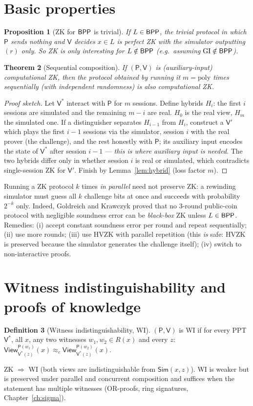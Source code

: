 \documentclass[11pt,a4paper]{report}
\theoremstyle{plain}
\newtheorem{theorem}{Theorem}[chapter]
\newtheorem{proposition}[theorem]{Proposition}
\theoremstyle{definition}
\newtheorem{definition}[theorem]{Definition}
\theoremstyle{remark}
\newcommand{\poly}{\mathrm{poly}}
\newcommand{\Prv}{\mathsf{P}}\newcommand{\Ver}{\mathsf{V}}
\newcommand{\Sim}{\mathsf{Sim}}\newcommand{\Ext}{\mathsf{Ext}}
\newcommand{\view}{\mathsf{View}}
\DeclareMathOperator{\GI}{GI}\DeclareMathOperator{\GNI}{GNI}
\begin{document}
\section{Basic properties}
\begin{proposition}[ZK for $\mathsf{BPP}$ is trivial]
If $L\in\mathsf{BPP}$, the trivial protocol in which $\Prv$ sends nothing and $\Ver$ decides $x\in L$ is perfect ZK with the simulator outputting $(r)$ only. So ZK is only interesting for $L\notin\mathsf{BPP}$ (e.g.\ assuming $\GI\notin\BPP$).
\end{proposition}
\begin{theorem}[Sequential composition]\label{thm:seqcomp}
If $(\Prv,\Ver)$ is (auxiliary-input) computational ZK, then the protocol obtained by running it $m=\poly$ times sequentially (with independent randomness) is also computational ZK.
\end{theorem}
\begin{proof}[Proof sketch]
Let $\Ver^*$ interact with $\Prv$ for $m$ sessions. Define hybrids $H_i$: the first $i$ sessions are simulated and the remaining $m-i$ are real. $H_0$ is the real view, $H_m$ the simulated one. If a distinguisher separates $H_{i-1}$ from $H_i$, construct a $\Ver'$ which plays the first $i-1$ sessions via the simulator, session $i$ with the real prover (the challenge), and the rest honestly with $\Prv$; its auxiliary input encodes the state of $\Ver^*$ after session $i-1$ --- \emph{this is where auxiliary input is needed}. The two hybrids differ only in whether session $i$ is real or simulated, which contradicts single-session ZK for $\Ver'$. Finish by Lemma~\ref{lem:hybrid} (loss factor $m$).
\end{proof}
\begin{warning}
Running a ZK protocol $k$ times \emph{in parallel} need not preserve ZK: a rewinding simulator must guess all $k$ challenge bits at once and succeeds with probability $2^{-k}$ only. Indeed, Goldreich and Krawczyk \cite{GK96} proved that no $3$-round public-coin protocol with negligible soundness error can be \emph{black-box} ZK unless $L\in\mathsf{BPP}$. Remedies: (i) accept constant soundness error per round and repeat sequentially; (ii) use more rounds; (iii) use HVZK with parallel repetition (this \emph{is} safe: HVZK is preserved because the simulator generates the challenge itself); (iv) switch to non-interactive proofs.
\end{warning}

\section{Witness indistinguishability and proofs of knowledge}
\begin{definition}[Witness indistinguishability, WI]
$(\Prv,\Ver)$ is WI if for every PPT $\Ver^*$, all $x$, any two witnesses $w_1,w_2\in R(x)$ and every $z$: $\view^{\Prv(w_1)}_{\Ver^*(z)}(x)\approx_c\view^{\Prv(w_2)}_{\Ver^*(z)}(x)$.
\end{definition}
ZK $\Rightarrow$ WI (both views are indistinguishable from $\Sim(x,z)$). WI is weaker but is preserved under parallel and concurrent composition and suffices when the statement has multiple witnesses (OR-proofs, ring signatures, Chapter~\ref{ch:sigma}).
\end{document}
